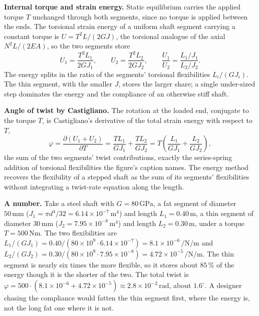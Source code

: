 

\textbf{Internal torque and strain energy.} Static equilibrium carries the
applied torque $T$ unchanged through both segments, since no torque is
applied between the ends. The torsional strain energy of a uniform shaft
segment carrying a constant torque is $U = T^2 L/(2GJ)$, the torsional
analogue of the axial $N^2L/(2EA)$, so the two segments store
\[
U_1 = \frac{T^2 L_1}{2 G J_1},
\qquad
U_2 = \frac{T^2 L_2}{2 G J_2},
\qquad
\frac{U_1}{U_2} = \frac{L_1/J_1}{L_2/J_2}.
\]
The energy splits in the ratio of the segments' torsional flexibilities
$L_i/(GJ_i)$. The thin segment, with the smaller $J$, stores the larger
share; a single under-sized step dominates the energy and the compliance of
an otherwise stiff shaft.

\textbf{Angle of twist by Castigliano.} The rotation at the loaded end,
conjugate to the torque $T$, is Castigliano's derivative of the total strain
energy with respect to $T$,
\[
\varphi = \frac{\partial (U_1 + U_2)}{\partial T}
= \frac{T L_1}{G J_1} + \frac{T L_2}{G J_2}
= T\left(\frac{L_1}{G J_1} + \frac{L_2}{G J_2}\right),
\]
the sum of the two segments' twist contributions, exactly the
series-spring addition of torsional flexibilities the figure's caption
names. The energy method recovers the flexibility of a stepped shaft as the
sum of its segments' flexibilities without integrating a twist-rate
equation along the length.

\textbf{A number.} Take a steel shaft with $G = 80\,\si{\giga\pascal}$, a
fat segment of diameter $50\,\si{\milli\meter}$ ($J_1 = \pi d^4/32 =
6.14\times 10^{-7}\,\si{\meter\tothe{4}}$) and length $L_1 = 0.40\,\si
{\meter}$, a thin segment of diameter $30\,\si{\milli\meter}$ ($J_2 =
7.95\times 10^{-8}\,\si{\meter\tothe{4}}$) and length $L_2 = 0.30\,\si
{\meter}$, under a torque $T = 500\,\si{\newton\meter}$. The two
flexibilities are $L_1/(GJ_1) = 0.40/(80\times 10^{9}\cdot 6.14\times
10^{-7}) = 8.1\times 10^{-6}\,\si{\per\newton\per\meter}$ and $L_2/(GJ_2) =
0.30/(80\times 10^{9}\cdot 7.95\times 10^{-8}) = 4.72\times 10^{-5}\,\si
{\per\newton\per\meter}$. The thin segment is nearly six times the more
flexible, so it stores about $85\,\%$ of the energy though it is the shorter
of the two. The total twist is $\varphi = 500\cdot(8.1\times 10^{-6} +
4.72\times 10^{-5}) \approx 2.8\times 10^{-2}\,\si{\radian}$, about
$1.6^\circ$. A designer chasing the compliance would fatten the thin
segment first, where the energy is, not the long fat one where it is not.

